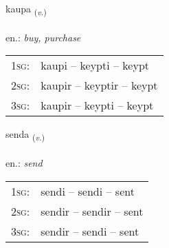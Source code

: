 \documentclass[frontgrid, backgrid]{flacards}\usepackage[]{graphicx}\usepackage[]{xcolor}
\begin{document}
{kaupa \small{\textsubscript{(\textit{v.})}} \\[1ex] %
\textphonetic{[kʰœiːpa]} \\
en.: \emph{buy, purchase} \\  [2ex]
\renewcommand*{\arraystretch}{0.8}
\begin{tabular}{p{1cm}l}
\textsc{1sg}: & kaupi -- keypti -- keypt \\ 
\textsc{2sg}: & kaupir -- keyptir -- keypt \\ 
\textsc{3sg}: & kaupir -- keypti -- keypt \\ 
\end{tabular}
}

\renewcommand{\flhead}{\vskip5pt \fboxsep=0pt {\small\bfseries\footnotesize Sagnorð | Verb}}
\renewcommand{\fcfoot}{\vskip5pt \fboxsep=0pt \hspace{2pt}{\small\bfseries\footnotesize 1K}}

\renewcommand{\blhead}{\vskip5pt {\small\bfseries\footnotesize Sagnorð | Verb }}
\renewcommand{\bcfoot}{\vskip5pt \hspace{2pt}{\small\bfseries\footnotesize 1K}}


{senda \small{\textsubscript{(\textit{v.})}} \\[1ex] %
\textphonetic{[sɛnta]} \\
en.: \emph{send} \\  [2ex]
\renewcommand*{\arraystretch}{0.8}
\begin{tabular}{p{1cm}l}
\textsc{1sg}: & sendi -- sendi -- sent \\ 
\textsc{2sg}: & sendir -- sendir -- sent \\ 
\textsc{3sg}: & sendir -- sendi -- sent \\ 
\end{tabular}
}

\renewcommand{\flhead}{\vskip5pt \fboxsep=0pt {\small\bfseries\footnotesize Sagnorð | Verb}}
\renewcommand{\fcfoot}{\vskip5pt \fboxsep=0pt \hspace{2pt}{\small\bfseries\footnotesize 1K}}
\end{document}
